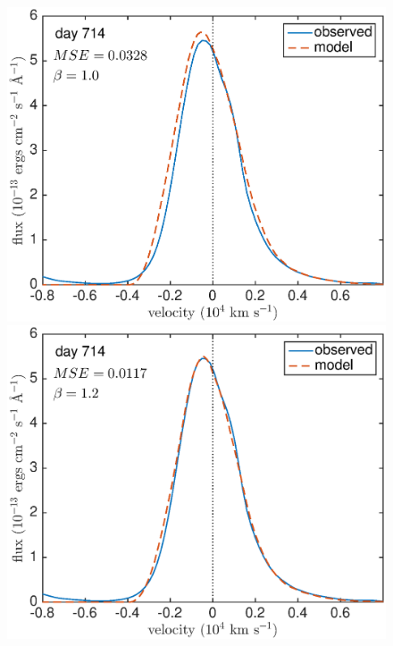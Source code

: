 \begin{figure}
\centering

\includegraphics[clip = true, scale=0.43, trim=20 0 40 0]{chapters/chapter5/images/MSE/d714_B/d714_B1_0}
\includegraphics[clip = true, scale=0.43, trim=52 0 40 0]{chapters/chapter5/images/MSE/d714_B/d714_B1_2}


\end{figure}
